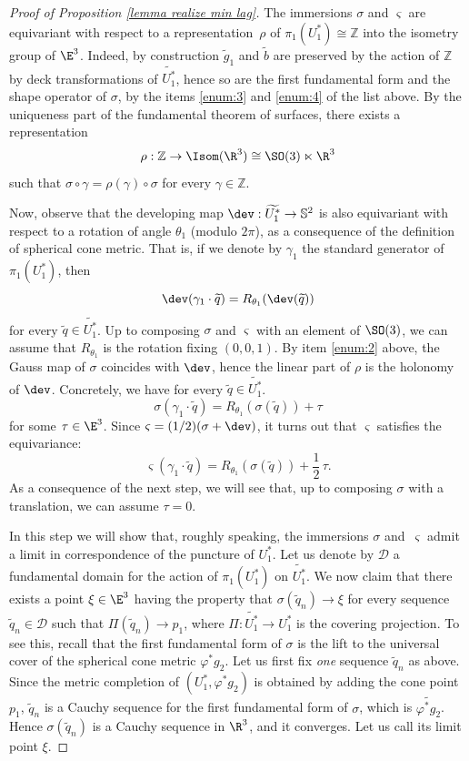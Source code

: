 \begin{proof}[Proof of Proposition \ref{lemma realize min lag}]
\step\label{step:2}
The immersions $\sigma$ and $ \varsigma$ are equivariant with respect to a representation~$\rho$ of $\pi_1(U_1^*)\cong\mathbb Z$ into the isometry group of $\E^3$. Indeed, by construction $\widetilde g_1$ and $\widetilde b$ are preserved by the action of $\mathbb Z$ by deck transformations of $\widetilde{U_1^*}$, hence so are the first fundamental form and the shape operator of $ \sigma$, by the items \eqref{enum:3} and \eqref{enum:4} of the list above. By the uniqueness part of the fundamental theorem of surfaces, there exists a representation
\[
\rho:\mathbb Z\to\Isom(\R^3)\cong\SO(3)\ltimes\R^3
\] such that $\sigma\circ \gamma=\rho(\gamma)\circ\sigma$ for every $\gamma\in\mathbb Z$.

Now, observe that the developing map $\dev:\widetilde{U_1^*}\to\mathbb S^2$ is also equivariant with respect to a rotation of angle $\theta_1$ (modulo $2\pi$), as a consequence of the definition of spherical cone metric. That is, if we denote by $\gamma_1$ the standard generator of $\pi_1(U_1^*)$, then
\[
\dev(\gamma_1\cdot \widetilde q)=R_{\theta_1}(\dev(\widetilde q))
\]
for every $\widetilde q\in \widetilde{U_1^*}$.
Up to composing $\sigma$ and $\varsigma$ with an element of $\SO(3)$, we can assume that $R_{\theta_1}$ is the rotation fixing $(0,0,1)$.
By item \eqref{enum:2} above, the Gauss map of $\sigma$ coincides with $\dev$, hence the linear part of $\rho$ is the holonomy of $\dev$. Concretely, we have for every $\widetilde q\in \widetilde{U_1^*}$.
\[
\sigma(\gamma_1\cdot \widetilde q)=R_{\theta_1}(\sigma(\widetilde q))+\tau
\]
for some $\tau\in \E^3$. Since $\varsigma=(1/2)(\sigma+\dev)$, it turns out that $\varsigma$ satisfies the equivariance:
\[
\varsigma(\gamma_1\cdot \widetilde q)=R_{\theta_1}(\sigma(\widetilde q))+\frac{1}{2}\,\tau.
\]
As a consequence of the next step, we will see that, up to composing $\sigma$ with a translation, we can assume $\tau=0$.

\step\label{step:3}
In this step we will show that, roughly speaking, the immersions $\sigma$ and~$\varsigma$ admit a limit in correspondence of the puncture of $U_1^*$. Let us denote by $\mathcal D$ a fundamental domain for the action of $\pi_1(U_1^*)$ on $\widetilde{U_1^*}$. We now claim that there exists a point $\xi\in\E^3$ having the property that $\sigma(\widetilde q_n)\to \xi$ for every sequence $\widetilde q_n\in\mathcal D$ such that $\Pi(\widetilde q_n)\to p_1$, where $\Pi:\widetilde{U_1^*}\to U_1^*$ is the covering projection.
To see this, recall that the first fundamental form of $\sigma$ is the lift to the universal cover of the spherical cone metric $\varphi^*g_2$. Let us first fix \emph{one} sequence $\widetilde q_n$ as above. Since the metric completion of $(U_1^*,\varphi^*g_2)$ is obtained by adding the cone point $p_1$, $\widetilde q_n$ is a Cauchy sequence for the first fundamental form of $\sigma$, which is $\widetilde{\varphi^*g_2}$. Hence $\sigma(\widetilde q_n)$ is a Cauchy sequence in $\R^3$, and it converges. Let us call its limit point $\xi$.


\end{proof}
